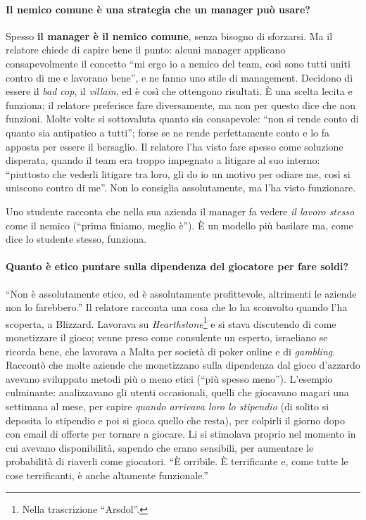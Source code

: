 \paragraph{Il nemico comune è una strategia che un manager può usare?} Spesso \textbf{il manager è
il nemico comune}, senza bisogno di sforzarsi. Ma il relatore chiede di capire bene il punto:
alcuni manager applicano consapevolmente il concetto ``mi ergo io a nemico del team, così sono
tutti uniti contro di me e lavorano bene'', e ne fanno uno stile di management. Decidono di essere
il \emph{bad cop}, il \emph{villain}, ed è così che ottengono risultati. È una scelta lecita e
funziona; il relatore preferisce fare diversamente, ma non per questo dice che non funzioni. Molte
volte si sottovaluta quanto sia consapevole: ``non si rende conto di quanto sia antipatico a
tutti''; forse se ne rende perfettamente conto e lo fa apposta per essere il bersaglio. Il relatore
l'ha visto fare spesso come soluzione disperata, quando il team era troppo impegnato a litigare al
suo interno: ``piuttosto che vederli litigare tra loro, gli do io un motivo per odiare me, così si
uniscono contro di me''. Non lo consiglia assolutamente, ma l'ha visto funzionare.

Uno studente racconta che nella sua azienda il manager fa vedere \emph{il lavoro stesso} come il
nemico (``prima finiamo, meglio è''). È un modello più basilare ma, come dice lo studente stesso,
funziona.

\paragraph{Quanto è etico puntare sulla dipendenza del giocatore per fare soldi?} ``Non è
assolutamente etico, ed è assolutamente profittevole, altrimenti le aziende non lo farebbero.'' Il
relatore racconta una cosa che lo ha sconvolto quando l'ha scoperta, a Blizzard. Lavorava su
\emph{Hearthstone}\footnote{Nella trascrizione ``Arsdol''.} e si stava discutendo di come
monetizzare il gioco; venne preso come consulente un esperto, israeliano se ricorda bene, che
lavorava a Malta per società di poker online e di \emph{gambling}. Raccontò che molte aziende che
monetizzano sulla dipendenza dal gioco d'azzardo avevano sviluppato metodi più o meno etici (``più
spesso meno''). L'esempio culminante: analizzavano gli utenti occasionali, quelli che giocavano
magari una settimana al mese, per capire \emph{quando arrivava loro lo stipendio} (di solito si
deposita lo stipendio e poi si gioca quello che resta), per colpirli il giorno dopo con email di
offerte per tornare a giocare. Li si stimolava proprio nel momento in cui avevano disponibilità, sapendo
che erano sensibili, per aumentare le probabilità di riaverli come giocatori. ``È orribile. È
terrificante e, come tutte le cose terrificanti, è anche altamente funzionale.''

